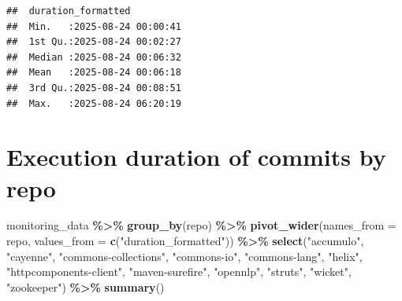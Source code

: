 \documentclass[
]{article}
\newenvironment{Shaded}{\begin{snugshade}}{\end{snugshade}}
\newcommand{\AttributeTok}[1]{\textcolor[rgb]{0.13,0.29,0.53}{#1}}
\newcommand{\FunctionTok}[1]{\textcolor[rgb]{0.13,0.29,0.53}{\textbf{#1}}}
\newcommand{\NormalTok}[1]{#1}
\newcommand{\SpecialCharTok}[1]{\textcolor[rgb]{0.81,0.36,0.00}{\textbf{#1}}}
\newcommand{\StringTok}[1]{\textcolor[rgb]{0.31,0.60,0.02}{#1}}
\begin{document}
\begin{verbatim}
##  duration_formatted           
##  Min.   :2025-08-24 00:00:41  
##  1st Qu.:2025-08-24 00:02:27  
##  Median :2025-08-24 00:06:32  
##  Mean   :2025-08-24 00:06:18  
##  3rd Qu.:2025-08-24 00:08:51  
##  Max.   :2025-08-24 06:20:19
\end{verbatim}

\section{Execution duration of commits by
repo}\label{execution-duration-of-commits-by-repo}

\begin{Shaded}
\begin{Highlighting}[]
\NormalTok{monitoring\_data }\SpecialCharTok{\%\textgreater{}\%}
    \FunctionTok{group\_by}\NormalTok{(repo) }\SpecialCharTok{\%\textgreater{}\%}
    \FunctionTok{pivot\_wider}\NormalTok{(}\AttributeTok{names\_from =}\NormalTok{ repo, }\AttributeTok{values\_from =} \FunctionTok{c}\NormalTok{(}\StringTok{"duration\_formatted"}\NormalTok{)) }\SpecialCharTok{\%\textgreater{}\%}
    \FunctionTok{select}\NormalTok{(}\StringTok{"accumulo"}\NormalTok{, }\StringTok{"cayenne"}\NormalTok{, }\StringTok{"commons{-}collections"}\NormalTok{, }\StringTok{"commons{-}io"}\NormalTok{, }\StringTok{"commons{-}lang"}\NormalTok{, }\StringTok{"helix"}\NormalTok{, }\StringTok{"httpcomponents{-}client"}\NormalTok{, }\StringTok{"maven{-}surefire"}\NormalTok{, }\StringTok{"opennlp"}\NormalTok{, }\StringTok{"struts"}\NormalTok{, }\StringTok{"wicket"}\NormalTok{, }\StringTok{"zookeeper"}\NormalTok{) }\SpecialCharTok{\%\textgreater{}\%}
    \FunctionTok{summary}\NormalTok{()}
\end{Highlighting}
\end{Shaded}
\end{document}
